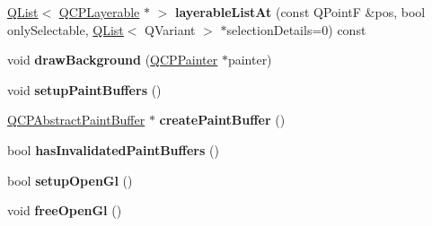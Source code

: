 \begin{DoxyCompactItemize}
\item 
\hyperlink{class_q_list}{Q\+List}$<$ \hyperlink{class_q_c_p_layerable}{Q\+C\+P\+Layerable} $\ast$ $>$ {\bfseries layerable\+List\+At} (const Q\+PointF \&pos, bool only\+Selectable, \hyperlink{class_q_list}{Q\+List}$<$ Q\+Variant $>$ $\ast$selection\+Details=0) const \hypertarget{class_q_custom_plot_ac0f5c6a88ae9b950071d847c381e5018}{}\label{class_q_custom_plot_ac0f5c6a88ae9b950071d847c381e5018}

\item 
void {\bfseries draw\+Background} (\hyperlink{class_q_c_p_painter}{Q\+C\+P\+Painter} $\ast$painter)\hypertarget{class_q_custom_plot_a05dd52438cee4353b18c1e53a439008d}{}\label{class_q_custom_plot_a05dd52438cee4353b18c1e53a439008d}

\item 
void {\bfseries setup\+Paint\+Buffers} ()\hypertarget{class_q_custom_plot_a2685341f7242c3882f4cc5e379308d71}{}\label{class_q_custom_plot_a2685341f7242c3882f4cc5e379308d71}

\item 
\hyperlink{class_q_c_p_abstract_paint_buffer}{Q\+C\+P\+Abstract\+Paint\+Buffer} $\ast$ {\bfseries create\+Paint\+Buffer} ()\hypertarget{class_q_custom_plot_a568ea46e60028b09a874bb1bc2b49847}{}\label{class_q_custom_plot_a568ea46e60028b09a874bb1bc2b49847}

\item 
bool {\bfseries has\+Invalidated\+Paint\+Buffers} ()\hypertarget{class_q_custom_plot_ad452b582348c8e99462d83fe1cd0279b}{}\label{class_q_custom_plot_ad452b582348c8e99462d83fe1cd0279b}

\item 
bool {\bfseries setup\+Open\+Gl} ()\hypertarget{class_q_custom_plot_a8954c4667c51070ff4e9b02d858fd190}{}\label{class_q_custom_plot_a8954c4667c51070ff4e9b02d858fd190}

\item 
void {\bfseries free\+Open\+Gl} ()\hypertarget{class_q_custom_plot_aaa3073362074581a7b5905726b4a0067}{}\label{class_q_custom_plot_aaa3073362074581a7b5905726b4a0067}

\end{DoxyCompactItemize}
